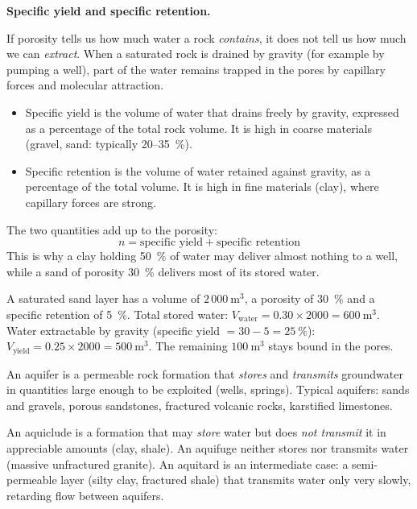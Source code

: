 \documentclass[11pt]{article}
\newcommand{\cle}[1]{{\popxbold\color{popdark}#1}}
\newcounter{popsec}
\newcounter{popsub}
\newcommand{\courssub}[1]{%
  \stepcounter{popsub}%
  \par\vspace{9pt}\noindent{\popxbold\fontsize{11.5}{13}\selectfont\color{popink}{\color{poporange}\thepopsec.\thepopsub}\hspace{6pt}#1}\par\nopagebreak\vspace{4pt}
}
\begin{document}
\textbf{Specific yield and specific retention.}\par
If porosity tells us how much water a rock \emph{contains}, it does not tell us how much we can \emph{extract}. When a saturated rock is drained by gravity (for example by pumping a well), part of the water remains trapped in the pores by capillary forces and molecular attraction.
\begin{itemize}
\item \cle{Specific yield} is the volume of water that drains freely by gravity, expressed as a percentage of the total rock volume. It is high in coarse materials (gravel, sand: typically 20--35\ \%).
\item \cle{Specific retention} is the volume of water retained against gravity, as a percentage of the total volume. It is high in fine materials (clay), where capillary forces are strong.
\end{itemize}
The two quantities add up to the porosity:
\[ n = \text{specific yield} + \text{specific retention} \]
This is why a clay holding 50\ \% of water may deliver almost nothing to a well, while a sand of porosity 30\ \% delivers most of its stored water.

\begin{exemplebox}
A saturated sand layer has a volume of $2\,000\ \mathrm{m^3}$, a porosity of 30\ \% and a specific retention of 5\ \%. Total stored water: $V_{\text{water}} = 0.30 \times 2000 = 600\ \mathrm{m^3}$. Water extractable by gravity (specific yield $= 30 - 5 = 25\ \%$): $V_{\text{yield}} = 0.25 \times 2000 = 500\ \mathrm{m^3}$. The remaining $100\ \mathrm{m^3}$ stays bound in the pores.
\end{exemplebox}

\courssub{Aquifers and Aquicludes}

\begin{definition}
An \cle{aquifer} is a permeable rock formation that \emph{stores} and \emph{transmits} groundwater in quantities large enough to be exploited (wells, springs). Typical aquifers: sands and gravels, porous sandstones, fractured volcanic rocks, karstified limestones.\par
An \cle{aquiclude} is a formation that may \emph{store} water but does \emph{not transmit} it in appreciable amounts (clay, shale). An \cle{aquifuge} neither stores nor transmits water (massive unfractured granite). An \cle{aquitard} is an intermediate case: a semi-permeable layer (silty clay, fractured shale) that transmits water only very slowly, retarding flow between aquifers.
\end{definition}
\end{document}
